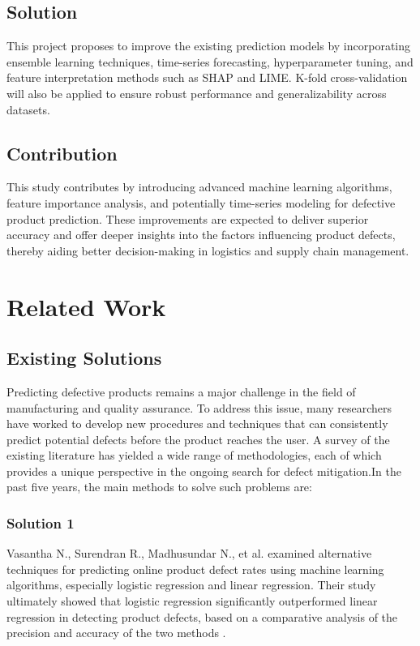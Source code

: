 \documentclass[conference]{IEEEtran}
\begin{document}
\subsection{Solution}
This project proposes to improve the existing prediction models by incorporating ensemble learning techniques, time-series forecasting, hyperparameter tuning, and feature interpretation methods such as SHAP and LIME. K-fold cross-validation will also be applied to ensure robust performance and generalizability across datasets.
\subsection{Contribution}
This study contributes by introducing advanced machine learning algorithms, feature importance analysis, and potentially time-series modeling for defective product prediction. These improvements are expected to deliver superior accuracy and offer deeper insights into the factors influencing product defects, thereby aiding better decision-making in logistics and supply chain management.


\section{Related Work}

\subsection{Existing Solutions}

Predicting defective products remains a major challenge in the field of manufacturing and quality assurance. To address this issue, many researchers have worked to develop new procedures and techniques that can consistently predict potential defects before the product reaches the user. A survey of the existing literature has yielded a wide range of methodologies, each of which provides a unique perspective in the ongoing search for defect mitigation.In the past five years, the main methods to solve such problems are:

\subsubsection{Solution 1}
Vasantha N., Surendran R., Madhusundar N., et al. \cite{vasu2022prediction} examined alternative techniques for predicting online product defect rates using machine learning algorithms, especially logistic regression and linear regression. Their study ultimately showed that logistic regression \cite{thota2020survey} significantly outperformed linear regression in detecting product defects, based on a comparative analysis of the precision and accuracy of the two methods \cite{vasu2022prediction}.
\end{document}
